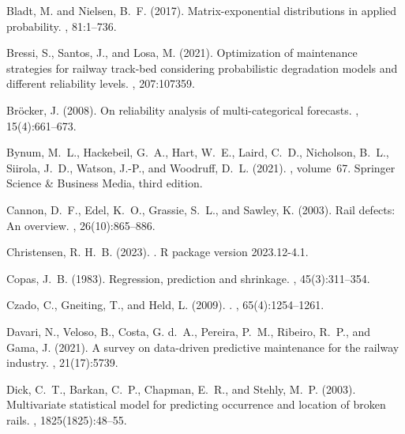 \documentclass{article}
\begin{document}
\begin{thebibliography}{}
Bladt, M. and Nielsen, B.~F. (2017).
\newblock Matrix-exponential distributions in applied probability.
, 81:1--736.

Bressi, S., Santos, J., and Losa, M. (2021).
\newblock Optimization of maintenance strategies for railway track-bed
  considering probabilistic degradation models and different reliability
  levels.
, 207:107359.

Bröcker, J. (2008).
\newblock On reliability analysis of multi-categorical forecasts.
, 15(4):661--673.

Bynum, M.~L., Hackebeil, G.~A., Hart, W.~E., Laird, C.~D., Nicholson, B.~L.,
  Siirola, J.~D., Watson, J.-P., and Woodruff, D.~L. (2021).
, volume~67.
\newblock Springer Science \& Business Media, third edition.

Cannon, D.~F., Edel, K.~O., Grassie, S.~L., and Sawley, K. (2003).
\newblock Rail defects: An overview.
,
  26(10):865--886.

Christensen, R. H.~B. (2023).
.
\newblock R package version 2023.12-4.1.

Copas, J.~B. (1983).
\newblock Regression, prediction and shrinkage.
, 45(3):311--354.

Czado, C., Gneiting, T., and Held, L. (2009).
.
, 65(4):1254--1261.

Davari, N., Veloso, B., Costa, G. d.~A., Pereira, P.~M., Ribeiro, R.~P., and
  Gama, J. (2021).
\newblock A survey on data-driven predictive maintenance for the railway
  industry.
, 21(17):5739.

Dick, C.~T., Barkan, C.~P., Chapman, E.~R., and Stehly, M.~P. (2003).
\newblock Multivariate statistical model for predicting occurrence and location
  of broken rails.
, 1825(1825):48--55.


\end{thebibliography}
\end{document}
